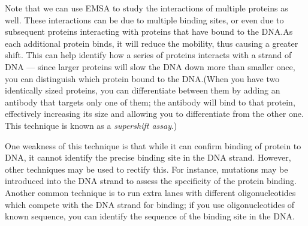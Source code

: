 \documentclass{article}
\begin{document}
Note that we can use EMSA to study the interactions of multiple proteins as well. These interactions
can be due to multiple binding sites, or even due to subsequent proteins interacting with proteins
that have bound to the DNA.\@ As each additional protein binds, it will reduce the mobility, thus
causing a greater shift. This can help identify how a series of proteins interacts with a strand of
DNA --- since larger proteins will slow the DNA down more than smaller once, you can distinguish
which protein bound to the DNA.\@ (When you have two identically sized proteins, you can differentiate
between them by adding an antibody that targets only one of them; the antibody will bind to that
protein, effectively increasing its size and allowing you to differentiate from the other one. This
technique is known as a \emph{supershift assay}.)

One weakness of this technique is that while it can confirm binding of protein to DNA, it cannot
identify the precise binding site in the DNA strand. However, other techniques may be used to
rectify this. For instance, mutations may be introduced into the DNA strand to assess the
specificity of the protein binding. Another common technique is to run extra lanes with different
oligonucleotides which compete with the DNA strand for binding; if you use oligonucleotides of known
sequence, you can identify the sequence of the binding site in the DNA.\@
\end{document}
